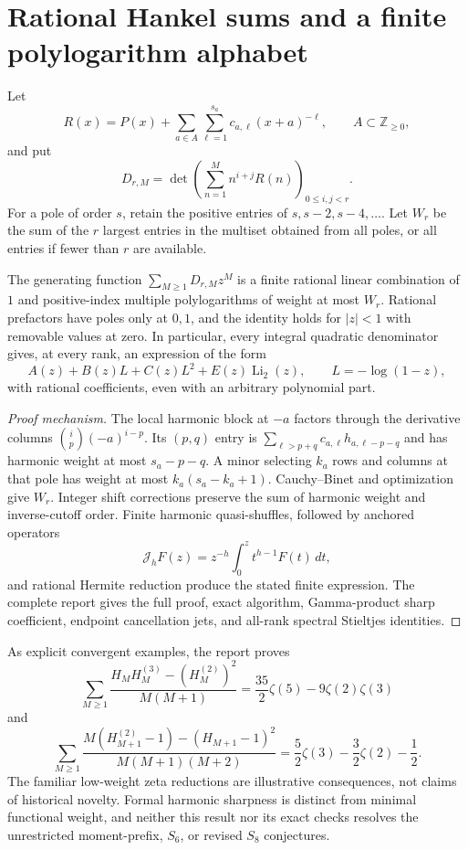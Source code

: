 \section{Rational Hankel sums and a finite polylogarithm alphabet}
\label{rhp:section}
Let
\[
 R(x)=P(x)+\sum_{a\in A}\sum_{\ell=1}^{s_a}
       c_{a,\ell}(x+a)^{-\ell},\qquad A\subset\mathbb Z_{\ge0},
\]
and put
\[
 D_{r,M}=\det\left(\sum_{n=1}^M n^{i+j}R(n)\right)_{0\le i,j<r}.
\]
For a pole of order $s$, retain the positive entries of
$s,s-2,s-4,\ldots$. Let $W_r$ be the sum of the $r$ largest entries in
the multiset obtained from all poles, or all entries if fewer than $r$
are available.

\begin{theorem}
\label{rhp:compiler}
The generating function $\sum_{M\ge1}D_{r,M}z^M$ is a finite rational
linear combination of $1$ and positive-index multiple polylogarithms
of weight at most $W_r$. Rational prefactors have poles only at $0,1$,
and the identity holds for $|z|<1$ with removable values at zero.
In particular, every integral quadratic denominator gives, at every
rank, an expression of the form
\[
 A(z)+B(z)L+C(z)L^2+E(z)\operatorname{Li}_2(z),
       \qquad L=-\log(1-z),
\]
with rational coefficients, even with an arbitrary polynomial part.
\end{theorem}
\begin{proof}[Proof mechanism]
The local harmonic block at $-a$ factors through the derivative columns
$\binom ip(-a)^{i-p}$. Its $(p,q)$ entry is
$\sum_{\ell>p+q}c_{a,\ell}h_{a,\ell-p-q}$ and has harmonic weight at
most $s_a-p-q$. A minor selecting $k_a$ rows and columns at that pole
has weight at most $k_a(s_a-k_a+1)$. Cauchy--Binet and optimization give
$W_r$. Integer shift corrections preserve the sum of harmonic weight
and inverse-cutoff order. Finite harmonic quasi-shuffles, followed by
anchored operators
\[
 \mathcal J_hF(z)=z^{-h}\int_0^z t^{h-1}F(t)\,dt,
\]
and rational Hermite reduction produce the stated finite expression.
The complete report gives the full proof, exact algorithm, Gamma-product
sharp coefficient, endpoint cancellation jets, and all-rank spectral
Stieltjes identities.
\end{proof}

As explicit convergent examples, the report proves
\[
 \sum_{M\ge1}\frac{H_M H_M^{(3)}-(H_M^{(2)})^2}{M(M+1)}
       =\frac{35}{2}\zeta(5)-9\zeta(2)\zeta(3)
\]
and
\[
 \sum_{M\ge1}\frac{M(H_{M+1}^{(2)}-1)-(H_{M+1}-1)^2}
                        {M(M+1)(M+2)}
       =\frac52\zeta(3)-\frac32\zeta(2)-\frac12.
\]
The familiar low-weight zeta reductions are illustrative consequences,
not claims of historical novelty. Formal harmonic sharpness is distinct
from minimal functional weight, and neither this result nor its exact
checks resolves the unrestricted moment-prefix, $S_6$, or revised
$S_8$ conjectures.
